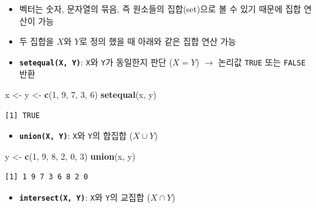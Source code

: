 \documentclass[
  11pt,
]{krantz}
\newenvironment{Shaded}{\begin{snugshade}}{\end{snugshade}}
\newcommand{\DecValTok}[1]{\textcolor[rgb]{0.06,0.06,0.06}{#1}}
\newcommand{\KeywordTok}[1]{\textcolor[rgb]{0.27,0.27,0.27}{\textbf{#1}}}
\newcommand{\NormalTok}[1]{#1}
\newcommand{\StringTok}[1]{\textcolor[rgb]{0.5,0.5,0.5}{#1}}
\providecommand{\tightlist}{%
  \setlength{\itemsep}{0pt}\setlength{\parskip}{0pt}}
\begin{document}
\begin{itemize}
\tightlist
\item
  벡터는 숫자, 문자열의 묶음, 즉 원소들의 집합(set)으로 볼 수 있기 때문에 집합 연산이 가능
\item
  두 집합을 \(X\)와 \(Y\)로 정의 했을 때 아래와 같은 집합 연산 가능
\item
  \textbf{\texttt{setequal(X,\ Y)}}: \texttt{X}와 \texttt{Y}가 동일한지 판단 (\(X = Y\)) \(\rightarrow\) 논리값 \texttt{TRUE} 또는 \texttt{FALSE} 반환
\end{itemize}

\footnotesize

\begin{Shaded}
\begin{Highlighting}[]
\NormalTok{x <-}\StringTok{ }\NormalTok{y <-}\StringTok{ }\KeywordTok{c}\NormalTok{(}\DecValTok{1}\NormalTok{, }\DecValTok{9}\NormalTok{, }\DecValTok{7}\NormalTok{, }\DecValTok{3}\NormalTok{, }\DecValTok{6}\NormalTok{)}
\KeywordTok{setequal}\NormalTok{(x, y)}
\end{Highlighting}
\end{Shaded}

\begin{verbatim}
[1] TRUE
\end{verbatim}

\normalsize

\begin{itemize}
\tightlist
\item
  \textbf{\texttt{union(X,\ Y)}}: \texttt{X}와 \texttt{Y}의 합집합 (\(X \cup Y\))
\end{itemize}

\footnotesize

\begin{Shaded}
\begin{Highlighting}[]
\NormalTok{y <-}\StringTok{ }\KeywordTok{c}\NormalTok{(}\DecValTok{1}\NormalTok{, }\DecValTok{9}\NormalTok{, }\DecValTok{8}\NormalTok{, }\DecValTok{2}\NormalTok{, }\DecValTok{0}\NormalTok{, }\DecValTok{3}\NormalTok{)}
\KeywordTok{union}\NormalTok{(x, y)}
\end{Highlighting}
\end{Shaded}

\begin{verbatim}
[1] 1 9 7 3 6 8 2 0
\end{verbatim}

\normalsize

\begin{itemize}
\tightlist
\item
  \textbf{\texttt{intersect(X,\ Y)}}: \texttt{X}와 \texttt{Y}의 교집합 (\(X \cap Y\))
\end{itemize}
\end{document}
